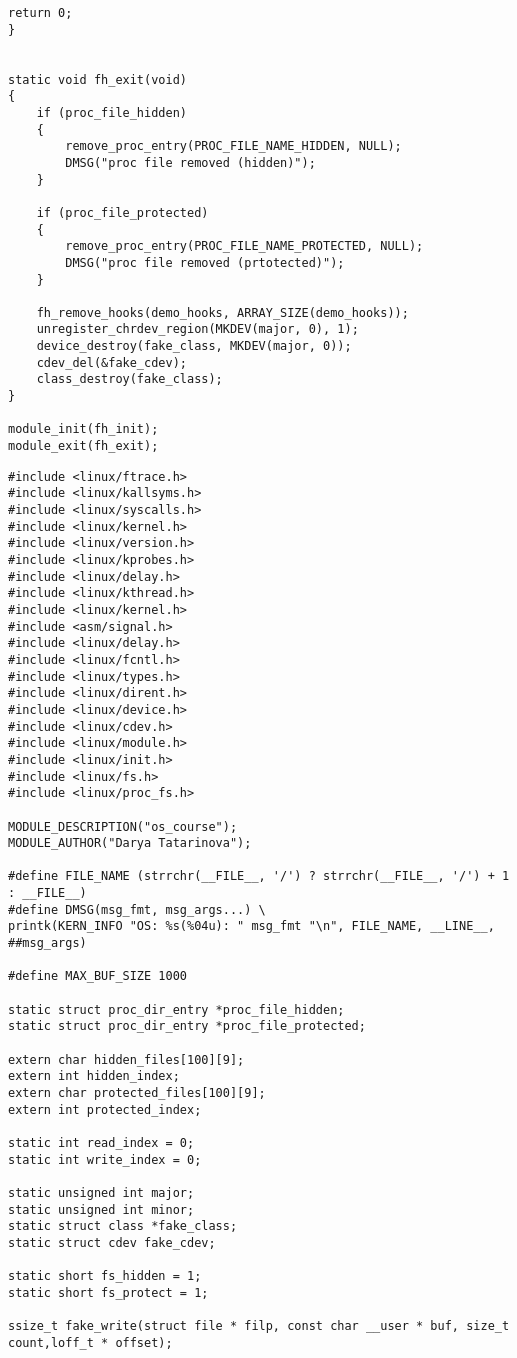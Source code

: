 \begin{lstlisting}[label=code:main,caption=Файл main.c]
	return 0;
}


static void fh_exit(void)
{
	if (proc_file_hidden) 
	{
		remove_proc_entry(PROC_FILE_NAME_HIDDEN, NULL);
		DMSG("proc file removed (hidden)");
	}
	
	if (proc_file_protected) 
	{
		remove_proc_entry(PROC_FILE_NAME_PROTECTED, NULL);
		DMSG("proc file removed (prtotected)");
	}
	
	fh_remove_hooks(demo_hooks, ARRAY_SIZE(demo_hooks));
	unregister_chrdev_region(MKDEV(major, 0), 1);
	device_destroy(fake_class, MKDEV(major, 0));
	cdev_del(&fake_cdev);
	class_destroy(fake_class);
}

module_init(fh_init);
module_exit(fh_exit);
\end{lstlisting}


\begin{lstlisting}[label=code:hook1,caption=Файл hook.h]
#include <linux/ftrace.h>
#include <linux/kallsyms.h>
#include <linux/syscalls.h>
#include <linux/kernel.h>
#include <linux/version.h>
#include <linux/kprobes.h>
#include <linux/delay.h>
#include <linux/kthread.h>
#include <linux/kernel.h>
#include <asm/signal.h>
#include <linux/delay.h>
#include <linux/fcntl.h>
#include <linux/types.h>
#include <linux/dirent.h>
#include <linux/device.h>
#include <linux/cdev.h>
#include <linux/module.h>
#include <linux/init.h>
#include <linux/fs.h>
#include <linux/proc_fs.h>

MODULE_DESCRIPTION("os_course");
MODULE_AUTHOR("Darya Tatarinova");

#define FILE_NAME (strrchr(__FILE__, '/') ? strrchr(__FILE__, '/') + 1 : __FILE__)
#define DMSG(msg_fmt, msg_args...) \
printk(KERN_INFO "OS: %s(%04u): " msg_fmt "\n", FILE_NAME, __LINE__, ##msg_args)

#define MAX_BUF_SIZE 1000

static struct proc_dir_entry *proc_file_hidden;
static struct proc_dir_entry *proc_file_protected;

extern char hidden_files[100][9];
extern int hidden_index;
extern char protected_files[100][9];
extern int protected_index;

static int read_index = 0;
static int write_index = 0;

static unsigned int major; 
static unsigned int minor; 
static struct class *fake_class;
static struct cdev fake_cdev;

static short fs_hidden = 1;
static short fs_protect = 1;

ssize_t fake_write(struct file * filp, const char __user * buf, size_t count,loff_t * offset);



\end{lstlisting}
